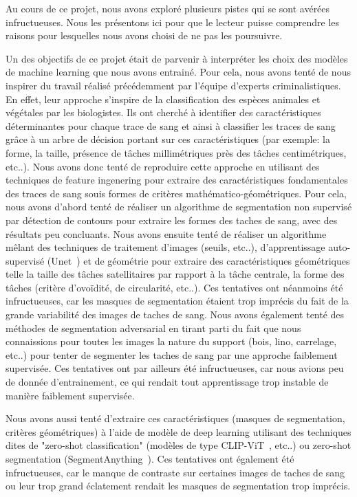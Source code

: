 Au cours de ce projet, nous avons exploré plusieurs pistes qui se sont avérées infructueuses. Nous les présentons ici pour que le lecteur puisse comprendre les raisons pour lesquelles nous avons choisi de ne pas les poursuivre.

Un des objectifs de ce projet était de parvenir à interpréter les choix des modèles de machine learning que nous avons entrainé.
Pour cela, nous avons tenté de nous inspirer du travail réalisé précédemment par l'équipe d'experts criminalistiques. En effet,
leur approche s'inspire de la classification des espèces animales et végétales par les biologistes. Ils ont cherché à identifier des caractéristiques
déterminantes pour chaque trace de sang et ainsi à classifier les traces de sang grâce à un arbre de décision
portant sur ces caractéristiques (par exemple: la forme, la taille, présence de tâches millimétriques près des tâches centimétriques, etc..).
Nous avons donc tenté de reproduire cette approche en utilisant des techniques de feature ingenering pour extraire des caractéristiques
fondamentales des traces de sang souis formes de critères mathématico-géométriques. Pour cela, nous avons d'abord tenté de réaliser
un algorithme de segmentation non supervisé par détection de contours pour extraire les formes des taches de sang, avec des résultats peu concluants. Nous avons ensuite
tenté de réaliser un algorithme mêlant des techniques de traitement d'images (seuils, etc..), d'apprentissage auto-supervisé (Unet~\cite{UNet}) et de géométrie pour extraire des caractéristiques géométriques telle la taille
des tâches satellitaires par rapport à la tâche centrale, la forme des tâches (critère d'ovoïdité, de circularité, etc..). Ces tentatives ont néanmoins
été infructueuses, car les masques de segmentation étaient trop imprécis du fait de la grande variabilité des images de taches de sang. Nous avons également tenté des méthodes de segmentation
adversarial en tirant parti du fait que nous connaissions pour toutes les images la nature du support (bois, lino, carrelage, etc..) pour tenter de segmenter les taches de sang par une approche faiblement supervisée. Ces tentatives ont par ailleurs été infructueuses, car nous 
avions peu de donnée d'entrainement, ce qui rendait tout apprentissage trop instable de manière faiblement supervisée.

Nous avons aussi tenté d'extraire ces caractéristiques (masques de segmentation, critères géométriques) à l'aide de modèle de deep learning
utilisant des techniques dites de "zero-shot classification" (modèles de type CLIP-ViT~\cite{CLip}, etc..) ou zero-shot segmentation (SegmentAnything~\cite{SegmentAnything}). Ces tentatives ont également été infructueuses, car le manque de contraste
sur certaines images de taches de sang ou leur trop grand éclatement rendait les masques de segmentation trop imprécis.